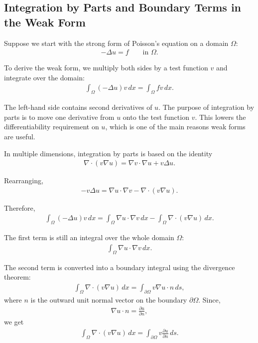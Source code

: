 \documentclass[../main.tex]{subfiles}
\begin{document}
\subsection{Integration by Parts and Boundary Terms in the Weak Form}

Suppose we start with the strong form of Poisson's equation on a domain $\Omega$:
\begin{align*}
    -\Delta u = f \qquad \text{in } \Omega.
\end{align*}

\noindent To derive the weak form, we multiply both sides by a test function $v$ and integrate over the domain:
\begin{align*}
    \int_\Omega (-\Delta u)v \, dx = \int_\Omega fv \, dx.
\end{align*}

\noindent The left-hand side contains second derivatives of $u$. The purpose of integration by parts is to move one derivative from $u$ onto the test function $v$. This lowers the differentiability requirement on $u$, which is one of the main reasons weak forms are useful.

\noindent In multiple dimensions, integration by parts is based on the identity
\begin{align*}
    \nabla \cdot (v \nabla u)
    =
    \nabla v \cdot \nabla u + v \Delta u.
\end{align*}

\noindent Rearranging,
\begin{align*}
    -v \Delta u
    =
    \nabla u \cdot \nabla v - \nabla \cdot (v \nabla u).
\end{align*}

\noindent Therefore,
\begin{align*}
    \int_\Omega (-\Delta u)v \, dx
    =
    \int_\Omega \nabla u \cdot \nabla v \, dx
    -
    \int_\Omega \nabla \cdot (v \nabla u) \, dx.
\end{align*}

\noindent The first term is still an integral over the whole domain $\Omega$:
\begin{align*}
    \int_\Omega \nabla u \cdot \nabla v \, dx.
\end{align*}

\noindent The second term is converted into a boundary integral using the divergence theorem:
\begin{align*}
    \int_\Omega \nabla \cdot (v \nabla u) \, dx
    =
    \int_{\partial \Omega} v \nabla u \cdot n \, ds,
\end{align*}
\noindent where $n$ is the outward unit normal vector on the boundary $\partial \Omega$. Since,
\begin{align*}
    \nabla u \cdot n = \frac{\partial u}{\partial n},
\end{align*}
we get
\begin{align*}
    \int_\Omega \nabla \cdot (v \nabla u) \, dx
    =
    \int_{\partial \Omega} v \frac{\partial u}{\partial n} \, ds.
\end{align*}
\end{document}
